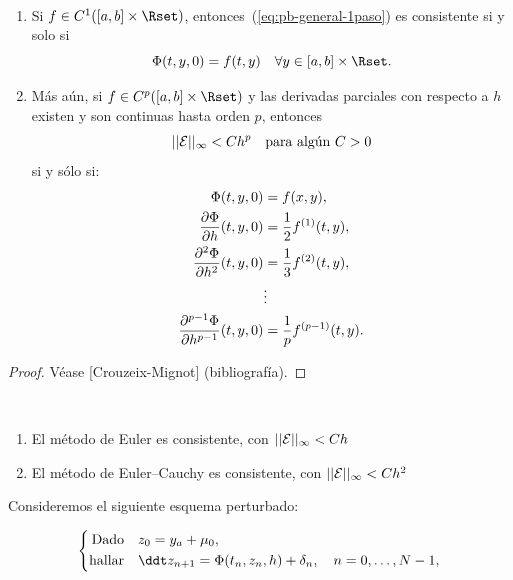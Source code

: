 \begin{theorem}[Consistencia]~
  \label{thm:consitencia-pb-general-1paso}
  \begin{enumerate}
  \item Si $f\in C^1([\ta,\tb]\times\Rset)$,
    entonces~(\ref{eq:pb-general-1paso}) es consistente si y solo si
    \begin{equation*}
      \Phi(t,y,0) = f(t,y)\quad \forall y\in[\ta,\tb]\times\Rset.
    \end{equation*}
  \item Más aún, si $f\in C^p([\ta,\tb]\times\Rset)$ y las derivadas
    parciales con respecto a $h$ existen y son continuas hasta orden
    $p$, entonces
    $$ ||{\cal E}||_\infty<C h^p \quad \text{para algún $C>0$}$$
    si y sólo si:
    \begin{align*}
      \Phi(t,y,0) &= f(x,y), \\
      \frac{\partial\Phi}{\partial h}(t,y,0) &=
                                               \frac{1}{2}\Dtotal1 f(t,y),
      \\
      \frac{\partial^2\Phi}{\partial h^2}(t,y,0) &=
                                                   \frac{1}{3}\Dtotal2 f(t,y),
      \\
                  &\vdots
      \\
      \frac{\partial^{p-1}\Phi}{\partial h^{p-1}}(t,y,0) &=
                                                           \frac{1}{p} \Dtotal{p-1} f(t,y).
    \end{align*}
  \end{enumerate}
\end{theorem}

\begin{proof}
  Véase [Crouzeix-Mignot] (bibliografía).
\end{proof}

\begin{example}~
  \begin{enumerate}
  \item
    El método de Euler es consistente, con  $ ||{\cal E}||_\infty<C h $
  \item El método de Euler--Cauchy es consistente, con $ ||{\cal
      E}||_\infty<C h^2 $
  \end{enumerate}
\end{example}

Consideremos el siguiente esquema perturbado:

\begin{equation}
  \label{eq:pb-perturbado-general-1paso}
  \left\{
    \begin{aligned}
      \text{Dado}\quad &z_0 = \ycero+\mu_0,\\
      \text{hallar}\quad &\ddt z_{n+1} = \Phi(\tn,z_n, h) + \delta_n, \quad
      n=0,\dots, N-1,
    \end{aligned}
  \right.
\end{equation}

